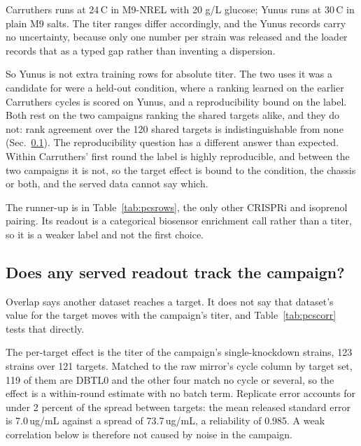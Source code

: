  Carruthers runs at
24\,\textdegree C in M9-NREL with 20 g/L glucose; Yunus runs at 30\,\textdegree C in
plain M9 salts. The titer ranges differ accordingly, and the Yunus records carry no
uncertainty, because only one number per strain was released and the loader records
that as a typed gap rather than inventing a dispersion.

So Yunus is not extra training rows for absolute titer. The two uses it was a candidate
for were a held-out condition, where a ranking learned on the earlier Carruthers cycles
is scored on Yunus, and a reproducibility bound on the label. Both rest on the two
campaigns ranking the shared targets alike, and they do not: rank agreement over the
120 shared targets is indistinguishable from none (Sec.~\ref{sec:iso-corr}). The
reproducibility question has a different answer than expected. Within Carruthers'
first round the label is highly reproducible, and between the two campaigns it is not,
so the target effect is bound to the condition, the chassis or both, and the served
data cannot say which.

The runner-up is  in
Table~\ref{tab:pcsrows}, the only other CRISPRi and isoprenol pairing. Its readout is a
categorical biosensor enrichment call rather than a titer, so it is a weaker label and
not the first choice.

\subsection{Does any served readout track the campaign?}\label{sec:iso-corr}

Overlap says another dataset reaches a target. It does not say that dataset's value for
the target moves with the campaign's titer, and Table~\ref{tab:pcscorr} tests that
directly.

 The per-target effect is the titer of
the campaign's single-knockdown strains, 123 strains over 121 targets. Matched to the
raw mirror's cycle column by target set, 119 of them are DBTL0 and the other four match
no cycle or several, so the effect is a within-round estimate with no batch term.
Replicate error accounts for under 2 percent of the spread between targets: the mean
released standard error is 7.0\,ug/mL against a spread of 73.7\,ug/mL, a reliability
of 0.985. A weak correlation below is therefore not caused by noise in the campaign.

